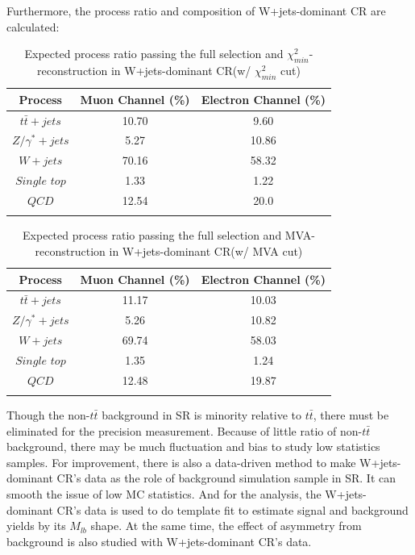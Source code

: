 		Furthermore, the process ratio and composition of W+jets-dominant CR are calculated:

		\begin{center}
		\begin{longtable}[H]{ c c c }
		\caption{Expected process ratio passing the full selection and $\chi^2_{min}$-reconstruction in W+jets-dominant CR(w/ $\chi^2_{min}$ cut)}\\
		\hline
		 Process & Muon Channel (\%) & Electron Channel (\%) \\ 
		\hline
		 $t\bar{t}+jets$ & 10.70 & 9.60 \\
		 $Z/\gamma^{*}+jets$ & 5.27 &  10.86 \\
		 $W+jets$ & 70.16 & 58.32 \\
		 $Single$ $top$ & 1.33 & 1.22 \\
		 $QCD$ & 12.54 & 20.0 \\
		\hline
		\label{EventSelReco:tb:MC_process_CR_a05_MLP_1C}
		\end{longtable}
		\end{center}
		\FloatBarrier

		\begin{center}
		\begin{longtable}[H]{ c c c }
		\caption{Expected process ratio passing the full selection and MVA-reconstruction in W+jets-dominant CR(w/ MVA cut)}\\
		\hline
		 Process & Muon Channel (\%) & Electron Channel (\%) \\ 
		\hline
		 $t\bar{t}+jets$ & 11.17 & 10.03 \\
		 $Z/\gamma^{*}+jets$ & 5.26 &  10.82 \\
		 $W+jets$ & 69.74 & 58.03 \\
		 $Single$ $top$ & 1.35 & 1.24 \\
		 $QCD$ & 12.48 & 19.87 \\
		\hline
		\label{EventSelReco:tb:MC_process_CR_a05_MLP_1C}
		\end{longtable}
		\end{center}
		\FloatBarrier

		Though the non-$t\bar{t}$ background in SR is minority relative to $t\bar{t}$, there must be eliminated for the precision measurement. Because of little ratio of non-$t\bar{t}$ background, there may be much fluctuation and bias to study low statistics samples. For improvement, there is also a data-driven method to make W+jets-dominant CR's data as the role of background simulation sample in SR. It can smooth the issue of low MC statistics. And for the analysis, the W+jets-dominant CR's data is used to do template fit to estimate signal and background yields by its $M_{lb}$ shape. At the same time, the effect of asymmetry from background is also studied with W+jets-dominant CR's data.

